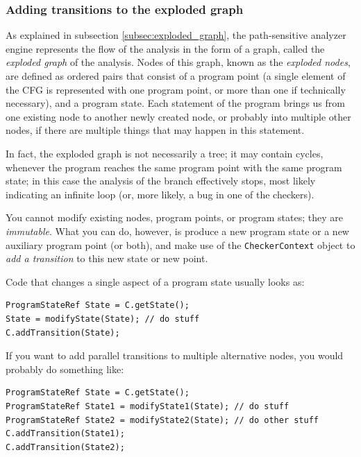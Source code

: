\documentclass[a4paper,12pt]{article}
\newenvironment{nobr}{\begin{minipage}{\textwidth}\setlength\parskip{1em}
}{\end{minipage}\ignorespacesafterend}
\begin{document}
\subsubsection{Adding transitions to the exploded graph}

As explained in subsection \ref{subsec:exploded_graph}, the path-sensitive analyzer engine represents the flow of the analysis in the form of a graph, called the \emph{exploded graph} of the analysis. Nodes of this graph, known as the \emph{exploded nodes}, are defined as ordered pairs that consist of a program point (a single element of the CFG is represented with one program point, or more than one if technically necessary), and a program state. Each statement of the program brings us from one existing node to another newly created node, or probably into multiple other nodes, if there are multiple things that may happen in this statement.

In fact, the exploded graph is not necessarily a tree; it may contain cycles, whenever the program reaches the same program point with the same program state; in this case the analysis of the branch effectively stops, most likely indicating an infinite loop (or, more likely, a bug in one of the checkers).

You cannot modify existing nodes, program points, or program states; they are \emph{immutable}. What you can do, however, is produce a new program state or a new auxiliary program point (or both), and make use of the \lstinline|CheckerContext| object to \emph{add a transition} to this new state or new point.

\begin{nobr}
Code that changes a single aspect of a program state usually looks as:

\begin{lstlisting}[style=cplusplus,numbers=none]
ProgramStateRef State = C.getState();
State = modifyState(State); // do stuff
C.addTransition(State);
\end{lstlisting}
\end{nobr}

\begin{nobr}
If you want to add parallel transitions to multiple alternative nodes, you would probably do something like:

\begin{lstlisting}[style=cplusplus,numbers=none]
ProgramStateRef State = C.getState();
ProgramStateRef State1 = modifyState1(State); // do stuff
ProgramStateRef State2 = modifyState2(State); // do other stuff
C.addTransition(State1);
C.addTransition(State2);
\end{lstlisting}
\end{nobr}
\end{document}
